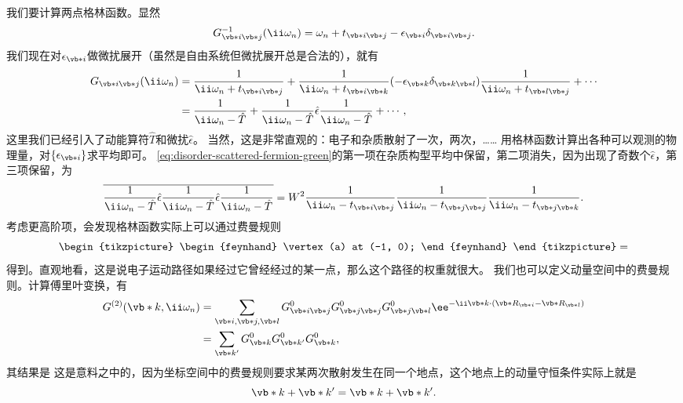 我们要计算两点格林函数。显然
\begin{equation}
    G^{-1}_{\vb*{i} \vb*{j}}(\ii \omega_n) = \omega_n + t_{\vb*{i} \vb*{j}} - \epsilon_{\vb*{i}} \delta_{\vb*{i} \vb*{j}}.
\end{equation}
我们现在对$\epsilon_{\vb*{i}}$做微扰展开（虽然是自由系统但微扰展开总是合法的），就有
\begin{equation}
    \begin{aligned}
        G_{\vb*{i} \vb*{j}}(\ii \omega_n) &= \frac{1}{\ii \omega_n + t_{\vb*{i} \vb*{j}}} + \frac{1}{\ii \omega_n + t_{\vb*{i} \vb*{k}}} (- \epsilon_{\vb*{k}} \delta_{\vb*{k} \vb*{l}}) \frac{1}{\ii \omega_n + t_{\vb*{l} \vb*{j}}} + \cdots \\
        &= \frac{1}{\ii \omega_n - \hat{T}} + \frac{1}{\ii \omega_n - \hat{T}} \hat{\epsilon} \frac{1}{\ii \omega_n - \hat{T}} + \cdots,
    \end{aligned}
    \label{eq:disorder-scattered-fermion-green}
\end{equation}
这里我们已经引入了动能算符$\hat{T}$和微扰$\hat{\epsilon}$。
当然，这是非常直观的：电子和杂质散射了一次，两次，……
用格林函数计算出各种可以观测的物理量，对$\{\epsilon_{\vb*{i}}\}$求平均即可。
\eqref{eq:disorder-scattered-fermion-green}的第一项在杂质构型平均中保留，第二项消失，因为出现了奇数个$\hat{\epsilon}$，第三项保留，为
\begin{equation}
    \overline{\frac{1}{\ii \omega_n - \hat{T}} \hat{\epsilon} \frac{1}{\ii \omega_n - \hat{T}} \hat{\epsilon} \frac{1}{\ii \omega_n - \hat{T}}} = W^2 \frac{1}{\ii \omega_n - t_{\vb*{i} \vb*{j}}} \frac{1}{\ii \omega_n - t_{\vb*{j} \vb*{j}}} \frac{1}{\ii \omega_n - t_{\vb*{j} \vb*{k}} }.
\end{equation}
考虑更高阶项，会发现格林函数实际上可以通过费曼规则
\begin{equation}
    \begin{gathered}
        \begin{tikzpicture}
            \begin{feynhand}
                \vertex (a) at (-1, 0);
            \end{feynhand}
        \end{tikzpicture}
    \end{gathered} = 
\end{equation}
得到。直观地看，这是说电子运动路径如果经过它曾经经过的某一点，那么这个路径的权重就很大。
我们也可以定义动量空间中的费曼规则。计算傅里叶变换，有
\[
    \begin{aligned}
        G^{(2)}(\vb*{k}, \ii \omega_n) &= \sum_{\vb*{i}, \vb*{j}, \vb*{l}} G_{\vb*{i} \vb*{j}}^{0} G_{\vb*{j} \vb*{j}}^{0} G_{\vb*{j} \vb*{l}}^0 \ee^{- \ii \vb*{k} \cdot (\vb*{R}_{\vb*{i}} - \vb*{R}_{\vb*{l}})} \\
        &= \sum_{\vb*{k}'} G_{\vb*{k}}^0 G_{\vb*{k}'}^0 G_{\vb*{k}}^0,
    \end{aligned}
\]
其结果是
这是意料之中的，因为坐标空间中的费曼规则要求某两次散射发生在同一个地点，这个地点上的动量守恒条件实际上就是
\[
    \vb*{k} + \vb*{k}' = \vb*{k} + \vb*{k}'.
\]


